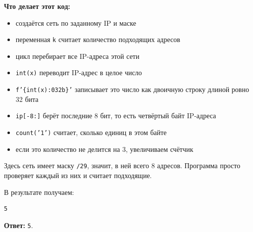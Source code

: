 \documentclass[11pt]{article}
\begin{document}
\textbf{Что делает этот код:}
\begin{itemize}
  \item создаётся сеть по заданному IP и маске
  \item переменная \texttt{k} считает количество подходящих адресов
  \item цикл перебирает все IP-адреса этой сети
  \item \texttt{int(x)} переводит IP-адрес в целое число
  \item \texttt{f'\{int(x):032b\}'} записывает это число как двоичную строку длиной ровно 32 бита
  \item \texttt{ip[-8:]} берёт последние 8 бит, то есть четвёртый байт IP-адреса
  \item \texttt{count('1')} считает, сколько единиц в этом байте
  \item если это количество не делится на 3, увеличиваем счётчик
\end{itemize}

Здесь сеть имеет маску \texttt{/29}, значит, в ней всего 8 адресов. Программа просто проверяет каждый из них и считает подходящие.

В результате получаем:
\begin{verbatim}
5
\end{verbatim}

\textbf{Ответ:} \texttt{5}.
\end{document}

